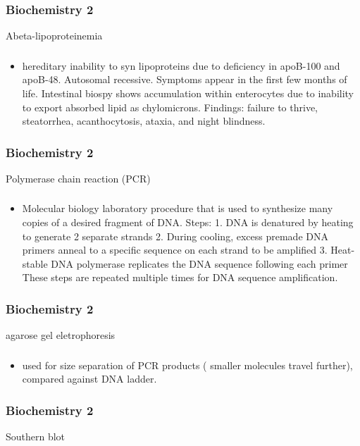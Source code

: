 \documentclass[11pt]{beamer}
\begin{document}
\begin{frame}
 \frametitle{Biochemistry 2}
Abeta-lipoproteinemia 
\end{frame}

\begin{frame}
 \frametitle{}
\begin{itemize}
\item hereditary inability to syn lipoproteins due to deficiency in apoB-100 and apoB-48. Autosomal recessive. Symptoms appear in the first few months of life. Intestinal biospy shows accumulation within enterocytes due to inability to export absorbed lipid as chylomicrons. Findings: failure to thrive, steatorrhea, acanthocytosis, ataxia, and night blindness. 
\end{itemize}
\end{frame}

\begin{frame}
 \frametitle{Biochemistry 2}
Polymerase chain reaction (PCR)
\end{frame}

\begin{frame}
 \frametitle{}
\begin{itemize}
\item Molecular biology laboratory procedure that is used to synthesize many copies of a desired fragment of DNA.
Steps: 1. DNA is denatured by heating to generate 2 separate strands 2. During cooling, excess premade DNA primers anneal to a specific sequence on each
strand to be amplified 3. Heat-stable DNA polymerase replicates the DNA sequence following each primer
These steps are repeated multiple times for DNA sequence amplification.
\end{itemize}
\end{frame}

\begin{frame}
 \frametitle{Biochemistry 2}
agarose gel eletrophoresis 
\end{frame}

\begin{frame}
 \frametitle{}
\begin{itemize}
\item used for size separation of PCR products ( smaller molecules travel further), compared against DNA ladder. 
\end{itemize}
\end{frame}

\begin{frame}
 \frametitle{Biochemistry 2}
Southern blot
\end{frame}
\end{document}
